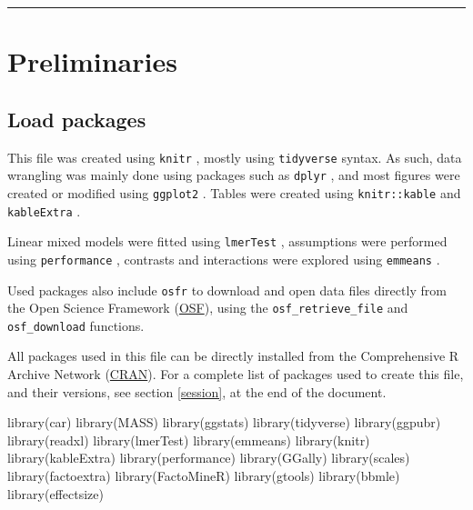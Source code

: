\documentclass[
  bookmarksnumbered]{article}
\newenvironment{Shaded}{\begin{snugshade}}{\end{snugshade}}
\newcommand{\FunctionTok}[1]{\textcolor[rgb]{0.94,0.94,0.56}{#1}}
\newcommand{\NormalTok}[1]{\textcolor[rgb]{0.80,0.80,0.80}{#1}}
\begin{document}
\begin{center}\rule{0.5\linewidth}{0.5pt}\end{center}

\section{Preliminaries}\label{preliminaries}

\subsection{Load packages}\label{load-packages}

This file was created using \texttt{knitr} \autocite{knitrcit}, mostly using \texttt{tidyverse} \autocite{tidyversecit} syntax. As such, data wrangling was mainly done using packages such as \texttt{dplyr} \autocite{dplyrcit}, and most figures were created or modified using \texttt{ggplot2} \autocite{ggplotcit}. Tables were created using \texttt{knitr::kable} and \texttt{kableExtra} \autocite{kableExtracit}.

Linear mixed models were fitted using \texttt{lmerTest} \autocite{lmertestcit}, assumptions were performed using \texttt{performance} \autocite{ludecke2021}, contrasts and interactions were explored using \texttt{emmeans} \autocite{emmeanscit}.

Used packages also include \texttt{osfr} \autocite{osfrcit} to download and open data files directly from the Open Science Framework (\href{https://osf.io/}{OSF}), using the \texttt{osf\_retrieve\_file} and \texttt{osf\_download} functions.

All packages used in this file can be directly installed from the Comprehensive R Archive Network (\href{https://cran.r-project.org/}{CRAN}). For a complete list of packages used to create this file, and their versions, see section \ref{session}, at the end of the document.

\begin{Shaded}
\begin{Highlighting}[]
\FunctionTok{library}\NormalTok{(car)}
\FunctionTok{library}\NormalTok{(MASS)}
\FunctionTok{library}\NormalTok{(ggstats)}
\FunctionTok{library}\NormalTok{(tidyverse)}
\FunctionTok{library}\NormalTok{(ggpubr)}
\FunctionTok{library}\NormalTok{(readxl)}
\FunctionTok{library}\NormalTok{(lmerTest)}
\FunctionTok{library}\NormalTok{(emmeans)}
\FunctionTok{library}\NormalTok{(knitr)}
\FunctionTok{library}\NormalTok{(kableExtra)}
\FunctionTok{library}\NormalTok{(performance)}
\FunctionTok{library}\NormalTok{(GGally)}
\FunctionTok{library}\NormalTok{(scales)}
\FunctionTok{library}\NormalTok{(factoextra)}
\FunctionTok{library}\NormalTok{(FactoMineR)}
\FunctionTok{library}\NormalTok{(gtools)}
\FunctionTok{library}\NormalTok{(bbmle)}
\FunctionTok{library}\NormalTok{(effectsize)}
\end{Highlighting}
\end{Shaded}
\end{document}
